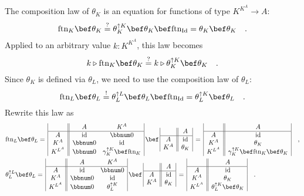 The composition law of $\theta_{K}$ is an equation for functions
of type $K^{K^{A}}\rightarrow A$:
\[
\text{ftn}_{K}\bef\theta_{K}\overset{?}{=}\theta_{K}^{\uparrow K}\bef\theta_{K}\bef\text{ftn}_{\text{Id}}=\theta_{K}\bef\theta_{K}\quad.
\]
Applied to an arbitrary value $k:K^{K^{A}}$, this law becomes
\[
k\triangleright\text{ftn}_{K}\bef\theta_{K}\overset{?}{=}k\triangleright\theta_{K}^{\uparrow K}\bef\theta_{K}\quad.
\]
Since $\theta_{K}$ is defined via $\theta_{L}$, we need to use the
composition law of $\theta_{L}$:
\[
\text{ftn}_{L}\bef\theta_{L}\overset{!}{=}\theta_{L}^{\uparrow L}\bef\theta_{L}\bef\text{ftn}_{\text{Id}}=\theta_{L}^{\uparrow K}\bef\theta_{L}\quad.
\]
Rewrite this law as
\begin{align*}
 & \text{ftn}_{L}\bef\theta_{L}=\,\begin{array}{|c||cc|}
 & A & K^{A}\\
\hline A & \text{id} & \bbnum 0\\
K^{A} & \bbnum 0 & \text{id}\\
K^{L^{A}} & \bbnum 0 & \gamma_{K}^{\uparrow K}\bef\text{ftn}_{K}
\end{array}\,\bef\,\begin{array}{|c||c|}
 & A\\
\hline A & \text{id}\\
K^{A} & \theta_{K}
\end{array}\,=\,\begin{array}{|c||c|}
 & A\\
\hline A & \text{id}\\
K^{A} & \theta_{K}\\
K^{L^{A}} & \gamma_{K}^{\uparrow K}\bef\text{ftn}_{K}\bef\theta_{K}
\end{array}\quad,\\
 & \theta_{L}^{\uparrow L}\bef\theta_{L}=\,\begin{array}{|c||cc|}
 & A & K^{A}\\
\hline A & \text{id} & \bbnum 0\\
K^{A} & \bbnum 0 & \text{id}\\
K^{L^{A}} & \bbnum 0 & \theta_{L}^{\uparrow K}
\end{array}\,\bef\,\begin{array}{|c||c|}
 & A\\
\hline A & \text{id}\\
K^{A} & \theta_{K}
\end{array}\,=\,\begin{array}{|c||c|}
 & A\\
\hline A & \text{id}\\
K^{A} & \theta_{K}\\
K^{L^{A}} & \theta_{L}^{\uparrow K}\bef\theta_{K}
\end{array}\quad.
\end{align*}
